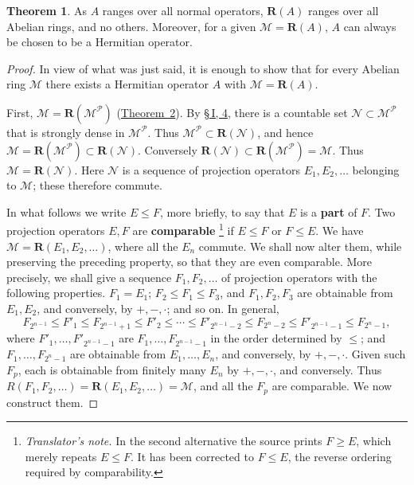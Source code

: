 \documentclass[
  paper=b5,
  twoside=true,
  fontsize=13pt,
  headings=normal,
  bookmarkpackage=false
]{scrartcl}
\theoremstyle{definition}
\newtheorem{theorem}{Theorem}
\newcommand{\TheoremRef}[1]{\hyperref[thm:#1]{Theorem~#1}}
\newcommand{\GeneratedRing}{\boldsymbol{R}}
\newcounter{translatornote}
\newcounter{savedfootnote}
\newcommand{\TranslatorNote}[1]{%
  \stepcounter{translatornote}%
  \setcounter{savedfootnote}{\value{footnote}}%
  \begingroup
    \renewcommand{\thefootnote}{T\arabic{translatornote}}%
    \footnote{\textit{Translator's note.} #1}%
  \endgroup
  \setcounter{footnote}{\value{savedfootnote}}}
\begin{document}
\begin{theorem}\label{thm:10}
As \(A\) ranges over all normal operators, \(\GeneratedRing (A)\) ranges over all
Abelian rings, and no others.  Moreover, for a given
\(\mathcal M=\GeneratedRing (A)\), \(A\) can always be chosen to be a Hermitian
operator.
\end{theorem}

\begin{proof}
In view of what was just said, it is enough to show that for every
Abelian ring \(\mathcal M\) there exists a Hermitian operator \(A\) with
\(\mathcal M=\GeneratedRing (A)\).

First, \(\mathcal M=\GeneratedRing (\mathcal M^{\mathcal P})\) (\TheoremRef{2}).
By \hyperref[sec:topologies-4]{\S\,I, 4}, there is a countable set
\(\mathcal N\subset\mathcal M^{\mathcal P}\) that is strongly dense in
\(\mathcal M^{\mathcal P}\). Thus \(\mathcal M^{\mathcal P}\subset \GeneratedRing (\mathcal N)\),
and hence \(\mathcal M=\GeneratedRing (\mathcal M^{\mathcal P})\subset \GeneratedRing (\mathcal N)\).
Conversely \(\GeneratedRing (\mathcal N)\subset \GeneratedRing (\mathcal M^{\mathcal P})=\mathcal M\).
Thus \(\mathcal M=\GeneratedRing (\mathcal N)\). Here \(\mathcal N\) is a sequence
of projection operators \(E_1,E_2,\ldots\) belonging to \(\mathcal M\);
these therefore commute.

In what follows we write \(E\leq F\), more briefly, to say that \(E\)
is a \textbf{part} of \(F\). Two projection operators \(E,F\) are
\textbf{comparable}\TranslatorNote{In the
second alternative the source prints
\(F\geq E\), which merely repeats \(E\leq F\).  It has been corrected
to \(F\leq E\), the reverse ordering required by comparability.} if
\(E\leq F\) or \(F\leq E\).
We have \(\mathcal M=\GeneratedRing (E_1,E_2,\ldots)\), where all the \(E_n\) commute.  We
shall now alter them, while preserving the preceding property, so that
they are even comparable.
More precisely, we shall give a sequence \(F_1,F_2,\ldots\) of
projection operators with the following properties. \(F_1=E_1\);
\(F_2\leq F_1\leq F_3\), and \(F_1,F_2,F_3\) are obtainable from
\(E_1,E_2\), and conversely, by \(+,-,\cdot\); and so on. In general,
\[
  F_{2^{n-1}}\leq F'_1\leq F_{2^{n-1}+1}\leq F'_2\leq\cdots
  \leq F'_{2^{n-1}-2}\leq F_{2^n-2}
  \leq F'_{2^{n-1}-1}\leq F_{2^n-1},
\]
where \(F'_1,\ldots,F'_{2^{n-1}-1}\) are
\(F_1,\ldots,F_{2^{n-1}-1}\) in the order determined by \(\leq\);
and \(F_1,\ldots,F_{2^n-1}\) are obtainable from \(E_1,\ldots,E_n\),
and conversely, by \(+,-,\cdot\). Given such \(F_p\), each is
obtainable from finitely many \(E_n\) by \(+,-,\cdot\), and conversely.
Thus \(R(F_1,F_2,\ldots)=\GeneratedRing (E_1,E_2,\ldots)=\mathcal M\), and all the
\(F_p\) are comparable. We now construct them.


\end{proof}
\end{document}
